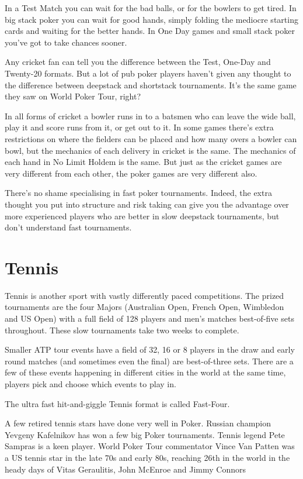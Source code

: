 In a Test Match you can wait for the bad balls, or for the bowlers to
get tired. In big stack poker you can wait for good hands, simply folding the
mediocre starting cards and waiting for the better hands. In One Day games
and small stack poker you've got to take chances sooner.

Any cricket fan can tell you the difference between the Test,
One-Day and Twenty-20 formats. But a lot of pub poker players haven't given any
thought to the difference between deepstack and shortstack
tournaments. It's the same game they saw on World Poker Tour,
right?

In all forms of cricket a bowler runs in to a batsmen who
can leave the wide ball, play it and score runs from it, or get out
to it. In some games there's extra restrictions on where the
fielders can be placed and how many overs a bowler
can bowl, but the mechanics of each delivery in cricket is the same.
The mechanics of each hand in No Limit Holdem is the same.
But just as the cricket games are very different from each other, the
poker games are very different also.

There's no shame specialising in fast poker tournaments. Indeed,
the extra thought you put into structure and risk taking can give
you the advantage over more experienced players who are better in
slow deepstack tournaments, but don't understand fast tournaments.

\section{Tennis}

Tennis is another sport with vastly differently paced competitions.
The prized tournaments are the four Majors (Australian Open,
French Open, Wimbledon and US Open) with a full field of 128 players
and men's matches best-of-five sets throughout. These slow tournaments
take two weeks to complete.

Smaller ATP tour events have a field of 32, 16 or 8 players in the draw
and early round matches (and sometimes even the final) are best-of-three
sets. There are a few of these events happening in different cities in
the world at the same time, players pick and choose which events
to play in.

The ultra fast hit-and-giggle Tennis format is called Fast-Four.

A few retired tennis stars have done very well in Poker. Russian
champion Yevgeny Kafelnikov has won a few big Poker tournaments.
Tennis legend Pete Sampras is a keen player. World Poker Tour
commentator Vince Van Patten was a US tennis star in the late
70s and early 80s, reaching 26th in the world in the heady days
of Vitas Geraulitis, John McEnroe and Jimmy Connors

